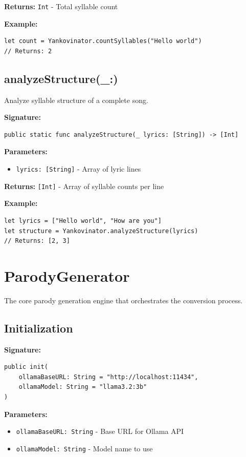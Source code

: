 \documentclass[11pt,a4paper]{article}
\begin{document}
\textbf{Returns:} \texttt{Int} - Total syllable count

\textbf{Example:}
\begin{lstlisting}
let count = Yankovinator.countSyllables("Hello world")
// Returns: 2
\end{lstlisting}

\subsection{analyzeStructure(\_:)}

Analyze syllable structure of a complete song.

\textbf{Signature:}
\begin{lstlisting}
public static func analyzeStructure(_ lyrics: [String]) -> [Int]
\end{lstlisting}

\textbf{Parameters:}
\begin{itemize}
    \item \texttt{lyrics: [String]} - Array of lyric lines
\end{itemize}

\textbf{Returns:} \texttt{[Int]} - Array of syllable counts per line

\textbf{Example:}
\begin{lstlisting}
let lyrics = ["Hello world", "How are you"]
let structure = Yankovinator.analyzeStructure(lyrics)
// Returns: [2, 3]
\end{lstlisting}

\section{ParodyGenerator}

The core parody generation engine that orchestrates the conversion process.

\subsection{Initialization}

\textbf{Signature:}
\begin{lstlisting}
public init(
    ollamaBaseURL: String = "http://localhost:11434",
    ollamaModel: String = "llama3.2:3b"
)
\end{lstlisting}

\textbf{Parameters:}
\begin{itemize}
    \item \texttt{ollamaBaseURL: String} - Base URL for Ollama API
    \item \texttt{ollamaModel: String} - Model name to use
\end{itemize}
\end{document}
